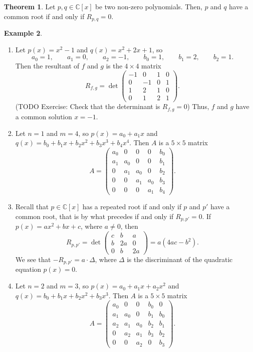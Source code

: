 \documentclass{article}
\newcommand{\C}{\mathbb{C}}
\newcommand{\rb}[1]{\left( #1 \right)}
\renewcommand{\sb}[1]{\left[ #1 \right]}
\theoremstyle{definition}\newtheorem{definition}{Definition}[section]
\theoremstyle{definition}\newtheorem{notation}[definition]{Notation}
\theoremstyle{definition}\newtheorem{remark}[definition]{Remark}
\theoremstyle{definition}\newtheorem{example}[definition]{Example}
\theoremstyle{definition}\newtheorem{fact}{Fact}
\theoremstyle{definition}\newtheorem{exercise}{Exercise}
\newtheorem{theorem}[definition]{Theorem}
\begin{document}
\begin{theorem}
\label{thm:9.3}
Let $ p, q \in \C\sb{x} $ be two non-zero polynomials. Then, $ p $ and $ q $ have a common root if and only if $ R_{p, q} = 0 $.
\end{theorem}

\begin{example}
\hfill
\begin{enumerate}
\item Let $ p\rb{x} = x^2 - 1 $ and $ q\rb{x} = x^2 + 2x + 1 $, so
$$ a_0 = 1, \qquad a_1 = 0, \qquad a_2 = -1, \qquad b_0 = 1, \qquad b_1 = 2, \qquad b_2 = 1. $$
Then the resultant of $ f $ and $ g $ is the $ 4 \times 4 $ matrix
$$ R_{f, g} = \det\begin{pmatrix} -1 & 0 & 1 & 0 \\ 0 & -1 & 0 & 1 \\ 1 & 2 & 1 & 0 \\ 0 & 1 & 2 & 1 \end{pmatrix}. $$
(TODO Exercise: Check that the determinant is $ R_{f, g} = 0 $) Thus, $ f $ and $ g $ have a common solution $ x = -1 $.
\item Let $ n = 1 $ and $ m = 4 $, so $ p\rb{x} = a_0 + a_1x $ and $ q\rb{x} = b_0 + b_1x + b_2x^2 + b_3x^3 + b_4x^4 $. Then $ A $ is a $ 5 \times 5 $ matrix
$$ A = \begin{pmatrix} a_0 & 0 & 0 & 0 & b_0 \\ a_1 & a_0 & 0 & 0 & b_1 \\ 0 & a_1 & a_0 & 0 & b_2 \\ 0 & 0 & a_1 & a_0 & b_3 \\ 0 & 0 & 0 & a_1 & b_4 \end{pmatrix}. $$
\item Recall that $ p \in \C\sb{x} $ has a repeated root if and only if $ p $ and $ p' $ have a common root, that is by what precedes if and only if $ R_{p, p'} = 0 $. If $ p\rb{x} = ax^2 + bx + c $, where $ a \ne 0 $, then
$$ R_{p, p'} = \det\begin{pmatrix} c & b & a \\ b & 2a & 0 \\ 0 & b & 2a \end{pmatrix} = a\rb{4ac - b^2}. $$
We see that $ -R_{p, p'} = a \cdot \Delta $, where $ \Delta $ is the discriminant of the quadratic equation $ p\rb{x} = 0 $.
\item Let $ n = 2 $ and $ m = 3 $, so $ p\rb{x} = a_0 + a_1x + a_2x^2 $ and $ q\rb{x} = b_0 + b_1x + b_2x^2 + b_3x^3 $. Then $ A $ is a $ 5 \times 5 $ matrix
$$ A = \begin{pmatrix} a_0 & 0 & 0 & b_0 & 0 \\ a_1 & a_0 & 0 & b_1 & b_0 \\ a_2 & a_1 & a_0 & b_2 & b_1 \\ 0 & a_2 & a_1 & b_3 & b_2 \\ 0 & 0 & a_2 & 0 & b_3 \end{pmatrix}. $$
\end{enumerate}
\end{example}
\end{document}
